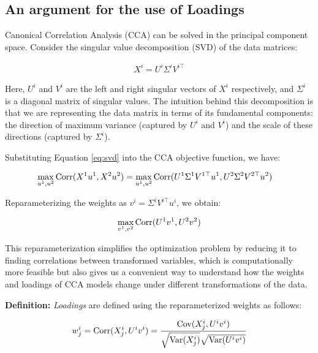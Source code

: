 \subsection{An argument for the use of Loadings}\label{subsec:an-argument-for-the-use-of-loadings}

Canonical Correlation Analysis (CCA) can be solved in the principal component space. Consider the singular value decomposition (SVD) of the data matrices:

\begin{align}
    X^{i} = U^{i}\Sigma^{i}V^{i\top} \label{eq:svd}
\end{align}

Here, $U^{i}$ and $V^{i}$ are the left and right singular vectors of $X^{i}$ respectively, and $\Sigma^{i}$ is a diagonal matrix of singular values. 
The intuition behind this decomposition is that we are representing the data matrix in terms of its fundamental components: the direction of maximum variance (captured by $U^{i}$ and $V^{i}$) and the scale of these directions (captured by $\Sigma^{i}$).

Substituting Equation \ref{eq:svd} into the CCA objective function, we have:

\begin{align}
    \max_{u^{1}, u^{2}} \operatorname{Corr}(X^{1}u^{1}, X^{2}u^{2}) &= \max_{u^{1}, u^{2}} \operatorname{Corr}(U^{1}\Sigma^{1}V^{1\top}u^{1}, U^{2}\Sigma^{2}V^{2\top}u^{2}) \label{eq:cca_obj}
\end{align}

Reparameterizing the weights as $v^{i} = \Sigma^{i}V^{i\top}u^{i}$, we obtain:

\begin{align}
    \max_{v^{1}, v^{2}} \operatorname{Corr}(U^{1}v^{1}, U^{2}v^{2}) \label{eq:reparam}
\end{align}

This reparameterization simplifies the optimization problem by reducing it to finding correlations between transformed variables, which is computationally more feasible but also gives us a convenient way to understand how the weights and loadings of CCA models change under different transformations of the data.

\textbf{Definition:} \textit{Loadings} are defined using the reparameterized weights as follows:

\begin{align}
    w^{i}_j = \operatorname{Corr}(X^{i}_j, U^{i}v^{i}) = \frac{\mathrm{Cov}(X^{i}_j, U^{i}v^{i})}{\sqrt{\mathrm{Var}(X^{i}_j)}\sqrt{\mathrm{Var}(U^{i}v^{i})}} \label{eq:loading_def}
\end{align}

